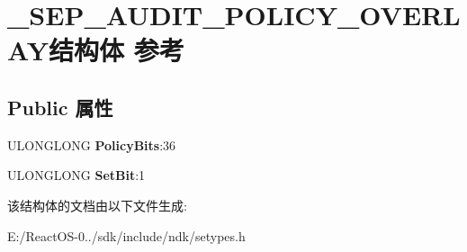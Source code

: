 \hypertarget{struct___s_e_p___a_u_d_i_t___p_o_l_i_c_y___o_v_e_r_l_a_y}{}\section{\+\_\+\+S\+E\+P\+\_\+\+A\+U\+D\+I\+T\+\_\+\+P\+O\+L\+I\+C\+Y\+\_\+\+O\+V\+E\+R\+L\+A\+Y结构体 参考}
\label{struct___s_e_p___a_u_d_i_t___p_o_l_i_c_y___o_v_e_r_l_a_y}
\subsection*{Public 属性}
\begin{DoxyCompactItemize}
\item 
\mbox{\label{struct___s_e_p___a_u_d_i_t___p_o_l_i_c_y___o_v_e_r_l_a_y_a5e750d732eadc98fabb4ba8265e2d0d0}} 
U\+L\+O\+N\+G\+L\+O\+NG {\bfseries Policy\+Bits}\+:36
\item 
\mbox{\label{struct___s_e_p___a_u_d_i_t___p_o_l_i_c_y___o_v_e_r_l_a_y_acf6a99d08598917aa640c4b86b3123d2}} 
U\+L\+O\+N\+G\+L\+O\+NG {\bfseries Set\+Bit}\+:1
\end{DoxyCompactItemize}


该结构体的文档由以下文件生成\+:\begin{DoxyCompactItemize}
\item 
E\+:/\+React\+O\+S-\/0../sdk/include/ndk/setypes.\+h\end{DoxyCompactItemize}
